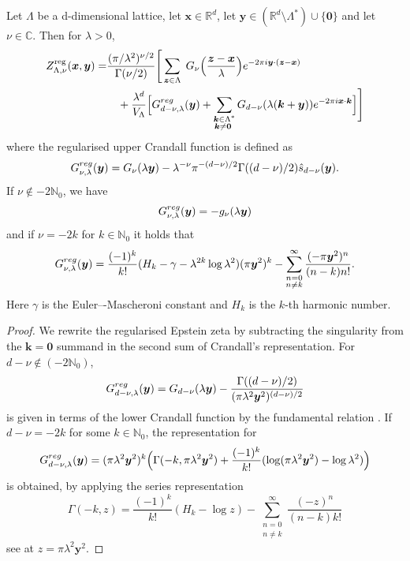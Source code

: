\documentclass[]{amsart}
\newcommand{\new}[1]{#1}
\newcommand{\zepsr}[3]{\new{Z_{#1}^{\mathrm{reg}}(#2, #3)}}
\numberwithin{mythm}{section}
\begin{document}
\begin{theorem}
\label{crandall-reg}
Let $\Lambda$ be a d-dimensional lattice, let $\bm x \in\mathds{R}^d$, let
$\bm y \in (\mathds R^d\setminus\Lambda^*)\cup\{\bm 0\}$ and let $\nu \in \mathds{C}$.
Then for $\lambda > 0$,
\begin{align*}
\zepsr{\Lambda,\nu}{\bm x}{\bm y}
=
&\frac{(\pi/\lambda^2)^{\nu/2}}{\Gamma(\nu/2)}
\Bigg[
\sum_{\bm{z}\in\Lambda}
\;G_{\nu}\Big(\frac{\bm{z}-\bm{x}}{\lambda}\Big)e^{-2\pi i\bm{y}\cdot(\bm{z}-\bm{x})} 
\\
&\quad
+\frac{\lambda^d}{V_{\Lambda}}
\Big[
G_{d-\nu,\lambda}^{\rm reg}(\bm y)+
\sum_{\substack{\bm{k}\in\Lambda^{\ast}\\ \bm k\neq \bm 0\,\,}}G_{d-\nu}
(\lambda(\bm{k}+\bm{y}))e^{-2\pi i \bm{x}\cdot \bm{k}}
\Big]\Bigg]
\end{align*}
where the regularised upper Crandall function is defined as
\[
G_{\nu,\lambda}^{\rm reg}(\bm y)
=
G_{\nu}(\lambda\bm y)-
\lambda^{-\nu}\pi^{-(d-\nu)/2}\Gamma((d-\nu)/2)\hat{s}_{d-\nu}(\bm y).
\]
If \(\nu\notin -2\mathds N_0\), we have
$$G_{\nu,\lambda}^{\rm reg}(\bm y)=
-g_{\nu}(\lambda \bm y) 
$$
and if \(\nu=-2k\) for \(k\in\mathds N_0\) it holds that
\[G^{\rm reg}_{\nu,\lambda}(\bm y)
=\frac{(-1)^k}{k!}(H_k-\gamma -\lambda^{2k}\log\lambda^2)(\pi \bm y^2)^k-\sum_{\substack{n=0 \\ n\neq k}}^{\infty}\frac{(-\pi \bm y^2)^n}{(n-k)n!}.
\]
Here \(\gamma\) is the Euler–-Mascheroni constant and \(H_k\) is the \(k\)-th harmonic number.
\end{theorem}


\begin{proof}
We rewrite the regularised Epstein zeta by subtracting the singularity from the \(\bm k = \bm 0\) summand in the second sum of Crandall's representation.
For ${d-\nu\notin (-2\mathds N_0)}$,
$$
G_{d-\nu,\lambda}^{\rm reg}(\bm y)
=G_{d-\nu}(\lambda \bm y) - \frac{\Gamma((d-\nu)/2)}{(\pi \lambda^2 \bm y^2)^{(d-\nu)/2}}
$$
is given in terms of the lower Crandall function by the 
fundamental relation \cite[Eq. (6.5.3)]{abramowitz}.
If $d-\nu=-2k$ for some $k\in\mathds N_0$, the representation for
$$
G_{d-\nu,\lambda}^{\rm reg}(\bm y)=
(\pi\lambda^2\bm y^2)^k\Big(\Gamma(-k,\pi\lambda^2\bm y^2)
+\frac{(-1)^{k}}{k!} (\log (\pi\lambda^2\bm y^2)-\log\lambda^2)\Big)
$$
is obtained, by
applying the series representation
\cite[Eq. (5.1.12)]{abramowitz}
$$\Gamma(-k,z)=
\frac{(-1)^{k}}{k!}(H_k-\log z)-\sum_{\substack{n=0 \\ n \neq k}}^{\infty}
\frac{(-z)^n}{(n-k)k!}
$$
see \cite[Eq. (5.1.12)]{abramowitz}
at \(z=\pi\lambda^2\bm y^2\).
\end{proof}
\end{document}
